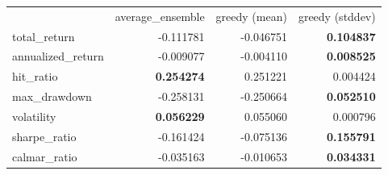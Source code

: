 \begin{tabular}{lrrr}
 & average_ensemble & greedy (mean) & greedy (stddev) \\
total_return & -0.111781 & -0.046751 & \bfseries 0.104837 \\
annualized_return & -0.009077 & -0.004110 & \bfseries 0.008525 \\
hit_ratio & \bfseries 0.254274 & 0.251221 & 0.004424 \\
max_drawdown & -0.258131 & -0.250664 & \bfseries 0.052510 \\
volatility & \bfseries 0.056229 & 0.055060 & 0.000796 \\
sharpe_ratio & -0.161424 & -0.075136 & \bfseries 0.155791 \\
calmar_ratio & -0.035163 & -0.010653 & \bfseries 0.034331 \\
\end{tabular}
